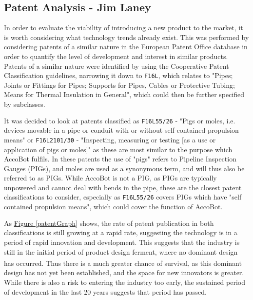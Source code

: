 \documentclass[11pt]{article}		%
\newcommand{\supercite}[1]{\textsuperscript{\cite{#1}}}		%
\newcommand{\figref}[1]{\hyperref[#1]{Figure \ref*{#1}}}    %
\begin{document}
	\subsection[Patent Analysis]{Patent Analysis - Jim Laney} \label{patentAnalysis}
        
        In order to evaluate the viability of introducing a new product to the market, it is worth considering what technology trends already exist.
        This was performed by considering patents of a similar nature in the European Patent Office database in order to quantify the level of development and interest in similar products.
        Patents of a similar nature were identified by using the Cooperative Patent Classification guidelines, narrowing it down to \verb|F16L|, which relates to "Pipes; Joints or Fittings for Pipes; Supports for Pipes, Cables or Protective Tubing; Means for Thermal Insulation in General"\cite{cpcSearch}, which could then be further specified by subclasses.
        
		It was decided to look at patents classified as \verb|F16L55/26| - "Pigs or moles, i.e. devices movable in a pipe or conduit with or without self-contained propulsion means" or \verb|F16L2101/30| - "Inspecting, measuring or testing [as a use or application of pigs or moles]" as these are most similar to the purpose which AccoBot fulfils.
		In these patents the use of "pigs" refers to Pipeline Inspection Gauges (PIGs), and moles are used as a synonymous term, and will thus also be referred to as PIGs.
		While AccoBot is not a PIG, as PIGs are typically unpowered and cannot deal with bends in the pipe, these are the closest patent classifications to consider, especially as \verb|F16L55/26| covers PIGs which have "self contained propulsion means", which could cover the function of AccoBot.
		
		As \figref{patentGraph} shows, the rate of patent publication in both classifications is still growing at a rapid rate, suggesting the technology is in a period of rapid innovation and development.
		This suggests that the industry is still in the initial period of product design ferment, where no dominant design has occurred\supercite{christensen1998innovation}.
		Thus there is a much greater chance of survival, as this dominant design has not yet been established, and the space for new innovators is greater.
		While there is also a risk to entering the industry too early, the sustained period of development in the last 20 years suggests that period has passed.
		
\end{document}

